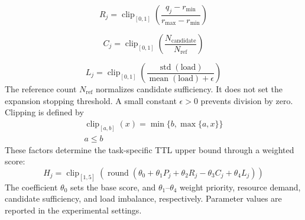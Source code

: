 \documentclass[type=submission,name=IR]{oae}
\begin{document}
\[
R_j=\operatorname{clip}_{[0,1]}\left(\frac{q_j-r_{\min}}{r_{\max}-r_{\min}}\right)
\]

\[
C_j=\operatorname{clip}_{[0,1]}
\left(
\frac{N_{\mathrm{candidate}}}{N_{\mathrm{ref}}}
\right)
\]

\[
L_j=\operatorname{clip}_{[0,1]}
\left(
\frac{\operatorname{std}(\mathrm{load})}
{\operatorname{mean}(\mathrm{load})+\epsilon}
\right)
\]
The reference count $N_{\mathrm{ref}}$ normalizes candidate sufficiency. It does not set the expansion stopping threshold. A small constant $\epsilon>0$ prevents division by zero. Clipping is defined by
\begin{equation}
\begin{gathered}
\operatorname{clip}_{[a,b]}(x)=\min\{b,\max\{a,x\}\}\\
a\leq b
\end{gathered}
\label{eq:clip_definition}
\end{equation}
These factors determine the task-specific TTL upper bound through a weighted score:
\[
H_j=
\operatorname{clip}_{[1,5]}
\left(
\operatorname{round}
\left(
\theta_0+\theta_1P_j+\theta_2R_j-\theta_3C_j+\theta_4L_j
\right)
\right)
\]
The coefficient $\theta_0$ sets the base score, and $\theta_1$--$\theta_4$ weight priority, resource demand, candidate sufficiency, and load imbalance, respectively. Parameter values are reported in the experimental settings.
\end{document}
